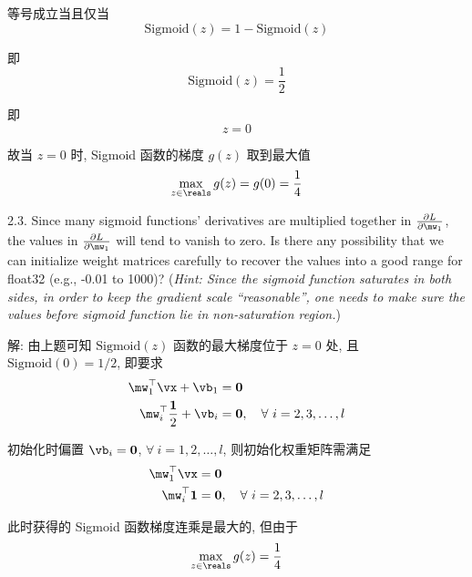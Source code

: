 \documentclass[openany]{ctexbook}
\theoremstyle{kaiti}
\theoremstyle{normal}
\begin{document}
等号成立当且仅当
\begin{equation}
  \mathrm{Sigmoid}(z)=1-\mathrm{Sigmoid}(z)
\end{equation}

即
\begin{equation}
  \mathrm{Sigmoid}(z)=\frac{1}{2}
\end{equation}

即
\begin{equation}
  z=0
\end{equation}

故当 $z=0$ 时, Sigmoid 函数的梯度 $g(z)$ 取到最大值
\begin{equation}
  \max_{z\in\reals}g(z)=g(0)=\frac{1}{4}
\end{equation}

2.3. Since many sigmoid functions' derivatives are multiplied together in $\frac{\partial L}{\partial \mw_1}$, the values in $\frac{\partial L}{\partial \mw_1}$ will tend to vanish to zero. Is there any possibility that we can initialize weight matrices carefully to recover the values into a good range for float32 (e.g., -0.01 to 1000)? (\emph{Hint: Since the sigmoid function saturates in both sides, in order to keep the gradient scale ``reasonable'', one needs to make sure the values before sigmoid function lie in non-saturation region.})

解: 由上题可知 $\mathrm{Sigmoid}(z)$ 函数的最大梯度位于 $z=0$ 处, 且 $\mathrm{Sigmoid}(0)=1/2$, 即要求
\begin{equation}
  \begin{aligned}
    \mw_1^\top\vx+\vb_1&=\bm{0}\\
    \mw_i^\top\frac{\bm{1}}{2}+\vb_i&=\bm{0},\quad\forall~i=2,3,\dots,l\\
  \end{aligned}
\end{equation}

初始化时偏置 $\vb_i=\bm{0}$, $\forall~i=1,2,\dots,l$, 则初始化权重矩阵需满足
\begin{equation}
  \begin{aligned}
    \mw_1^\top\vx&=\bm{0}\\
    \mw_i^\top\bm{1}&=\bm{0},\quad\forall~i=2,3,\dots,l\\
  \end{aligned}
\end{equation}

此时获得的 Sigmoid 函数梯度连乘是最大的, 但由于
\begin{equation}
  \max_{z\in\reals} g(z)=\frac{1}{4}
\end{equation}
\end{document}
